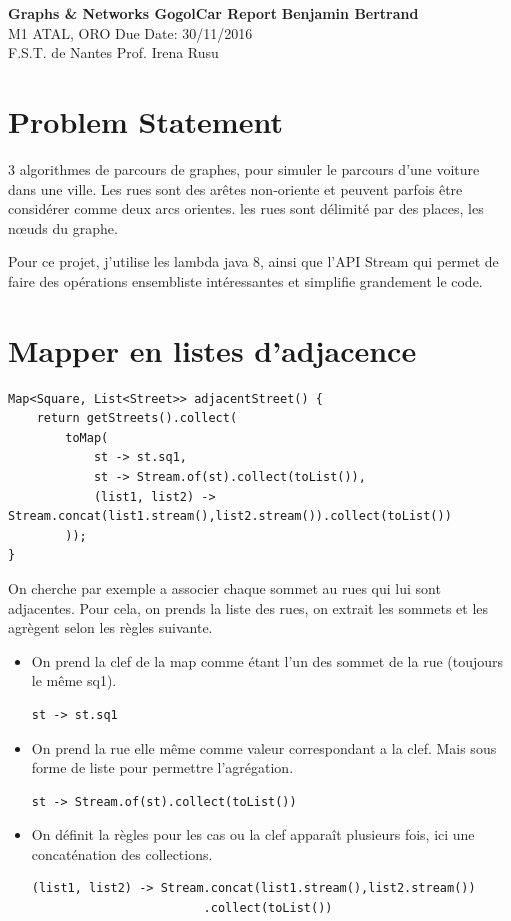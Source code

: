 \documentclass[a4paper, 11pt]{article}
\begin{document}
\noindent
\large\textbf{Graphs \& Networks \- GogolCar Report} \hfill \textbf{Benjamin Bertrand} \\
\normalsize M1 ATAL, ORO \hfill Due Date: 30/11/2016 \\
F.S.T. de Nantes \hfill Prof. Irena Rusu\\


\section*{Problem Statement}
3 algorithmes de parcours de graphes, pour simuler le parcours d'une voiture
dans une ville. Les rues sont des arêtes non-oriente et peuvent parfois être
considérer comme deux arcs orientes. les rues sont délimité par des places, les
nœuds du graphe.

Pour ce projet, j'utilise les lambda java 8, ainsi que l'API Stream qui permet
de faire des opérations ensembliste intéressantes et simplifie grandement le
code.

\section{Mapper en listes d'adjacence}
\begin{verbatim}
Map<Square, List<Street>> adjacentStreet() {
    return getStreets().collect(
        toMap(
            st -> st.sq1, 
            st -> Stream.of(st).collect(toList()), 
            (list1, list2) -> Stream.concat(list1.stream(),list2.stream()).collect(toList())
        )); 
}
\end{verbatim}
On cherche par exemple a associer chaque sommet au rues qui lui sont adjacentes.
Pour cela, on prends la liste des rues, on extrait les sommets et les agrègent
selon les règles suivante.

\begin{itemize}
  \item On prend la clef de la map comme étant l'un des sommet de la rue (toujours le même sq1).
\begin{verbatim}
st -> st.sq1
\end{verbatim}

\item On prend la rue elle même comme valeur correspondant a la clef. Mais sous
forme de liste pour permettre l’agrégation.
\begin{verbatim}
st -> Stream.of(st).collect(toList())
\end{verbatim}

\item On définit la règles pour les cas ou la clef apparaît plusieurs fois, ici
une concaténation des collections.
\begin{verbatim}
(list1, list2) -> Stream.concat(list1.stream(),list2.stream())
                        .collect(toList())
\end{verbatim}
\end{itemize}
\end{document}
